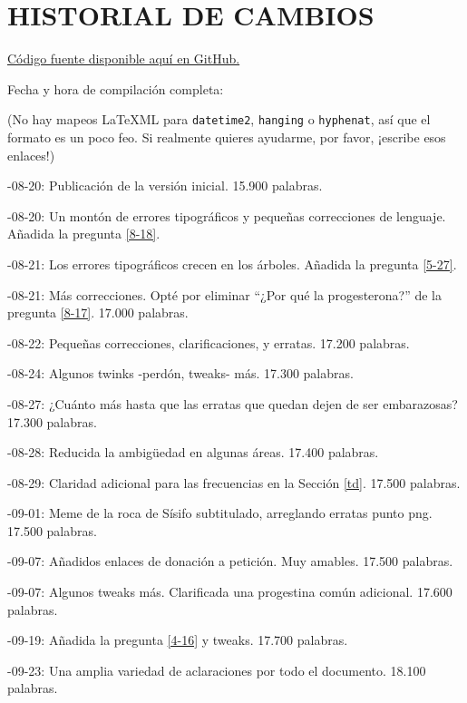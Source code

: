 \documentclass{article}
\begin{document}
\section*{HISTORIAL DE CAMBIOS}

\noindent \href{https://github.com/Juicysteak117/pghrt/}{Código fuente disponible aquí en GitHub.}

\noindent Fecha y hora de compilación completa: \DTMnow

\noindent(No hay mapeos LaTeXML para \texttt{datetime2}, \texttt{hanging} o \texttt{hyphenat}, así que el formato es un poco feo. Si realmente quieres ayudarme, por favor, ¡escribe esos enlaces!)

-08-20: Publicación de la versión inicial. 15.900 palabras.

-08-20: Un montón de errores tipográficos y pequeñas correcciones de lenguaje. Añadida la pregunta \ref{8-18}.

-08-21: Los errores tipográficos crecen en los árboles. Añadida la pregunta \ref{5-27}.

-08-21: Más correcciones. Opté por eliminar “¿Por qué la progesterona?” de la pregunta \ref{8-17}. 17.000 palabras.

-08-22: Pequeñas correcciones, clarificaciones, y erratas. 17.200 palabras.

-08-24: Algunos twinks -perdón, tweaks- más. 17.300 palabras.

-08-27: ¿Cuánto más hasta que las erratas que quedan dejen de ser embarazosas? 17.300 palabras.

-08-28: Reducida la ambigüedad en algunas áreas. 17.400 palabras.

-08-29: Claridad adicional para las frecuencias en la Sección \ref{td}. 17.500 palabras.

-09-01: Meme de la roca de Sísifo subtitulado, arreglando erratas punto png. 17.500 palabras.

-09-07: Añadidos enlaces de donación a petición. Muy amables. 17.500 palabras.

-09-07: Algunos tweaks más. Clarificada una progestina común adicional. 17.600 palabras.

-09-19: Añadida la pregunta \ref{4-16} y tweaks. 17.700 palabras.

-09-23: Una amplia variedad de aclaraciones por todo el documento. 18.100 palabras.
\end{document}
